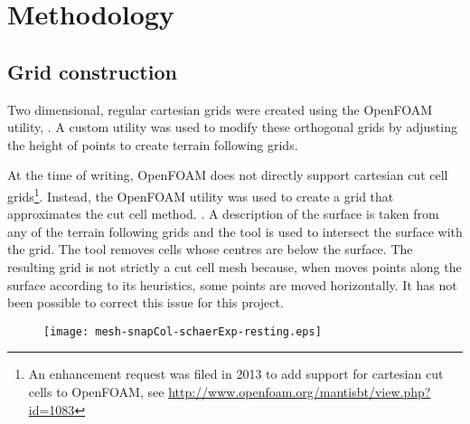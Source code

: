 \chapter{Methodology}

\section{Grid construction}
Two dimensional, regular cartesian grids were created using the OpenFOAM utility, .  A custom utility was used to modify these orthogonal grids by adjusting the height of points to create terrain following grids.

At the time of writing, OpenFOAM does not directly support cartesian cut cell grids\footnote{An enhancement request was filed in 2013 to add support for cartesian cut cells to OpenFOAM, see \url{http://www.openfoam.org/mantisbt/view.php?id=1083}}.  Instead, the  OpenFOAM utility was used to create a grid that approximates the cut cell method.  .  A description of the surface is taken from any of the terrain following grids and the tool is used to intersect the surface with the grid.  The tool removes cells whose centres are below the surface.  The resulting grid is not strictly a cut cell mesh because, when  moves points along the surface according to its heuristics, some points are moved horizontally.  It has not been possible to correct this issue for this project.

\begin{figure}
	\centerfloat
	\texttt{[image: mesh-snapCol-schaerExp-resting.eps]}
	\caption{}
	\label{fig:method:cut-cell}
\end{figure}
